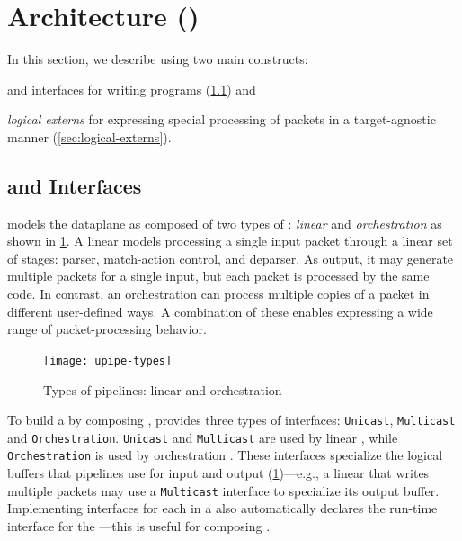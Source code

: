 \documentclass[letterpaper,twocolumn,10pt]{article}
\begin{document}
\section{\uswitch Architecture (\uarch)}
\label{sec:architecture}
In this section, we describe \uarch using two main constructs:
\begin{enumerate*}[label=(\roman*)]
  \item \emph{\upipelines} and interfaces for writing \ulang programs
    (\cref{sec:pipelines}) and
  \item \emph{logical externs} for expressing special processing of
    packets in a target-agnostic manner (\cref{sec:logical-externs}).
\end{enumerate*}


\subsection{\upipelines and Interfaces}
\label{sec:pipelines}

%
\uarch models the dataplane as composed of two types of \upipelines:
\emph{linear} and \emph{orchestration} as shown in
\cref{fig:pipe-types}. A linear \upipeline models processing a single
input packet through a linear set of stages: parser, match-action
control, and deparser.  As output, it may generate multiple packets
for a single input, but each packet is processed by the same code. In
contrast, an orchestration \upipeline can process multiple copies of a
packet in different user-defined ways. A combination of these
\upipelines enables expressing a wide range of packet-processing
behavior.
\begin{figure}[!tbp]
  \centering
  \texttt{[image: upipe-types]}
  \caption{Types of \uarch pipelines: linear and orchestration}
  \label{fig:pipe-types}
\end{figure}

%
To build a \uprogram by composing \upipelines, \uarch provides three
types of interfaces: \texttt{Unicast}, \texttt{Multicast} and
\texttt{Orchestration}.  \texttt{Unicast} and \texttt{Multicast} are
used by linear \upipelines, while \texttt{Orchestration} is used by
orchestration \upipelines. These interfaces specialize the logical
buffers that pipelines use for input and output
(\cref{fig:pipe-types})---e.g., a linear \upipeline that writes
multiple packets may use a \texttt{Multicast} interface to specialize
its output buffer. Implementing interfaces for each \upipeline in a
\uprogram also automatically declares the run-time interface for the
\uprogram---this is useful for composing \uprograms.
\end{document}

